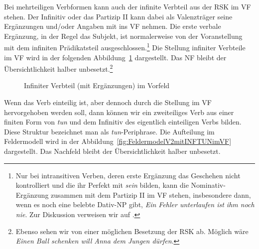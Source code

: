 Bei mehrteiligen Verbformen kann auch der infinite Verbteil aus der RSK im VF stehen. Der Infinitiv oder das Partizip II kann dabei als Valenzträger seine Ergänzungen und/oder Angaben mit ins VF nehmen. Die erste verbale Ergänzung, in der Regel das Subjekt, ist normalerweise von der Voranstellung mit dem infiniten Prädikatsteil ausgeschlossen.\footnote{Nur bei intransitiven Verben, deren erste Ergänzung das Geschehen nicht kontrolliert und die ihr Perfekt mit \textit{sein} bilden, kann die Nominativ-Ergänzung zusammen mit dem Partizip II im VF stehen, insbesondere dann, wenn es noch eine belebte Dativ-NP gibt, \zB \textit{Ein Fehler unterlaufen ist ihm noch nie}. Zur Diskussion verweisen wir auf \citet{Fanselow1992}.} Die Stellung infiniter Verbteile im VF wird in der folgenden Abbildung~\ref{fig:FeldermodelV2mitINFimVF} dargestellt. Das NF bleibt der Übersichtlichkeit halber unbesetzt.\footnote{Ebenso sehen wir von einer möglichen Besetzung der RSK ab. Möglich wäre \zB \textit{Einen Ball schenken will Anna dem Jungen dürfen}.}

\begin{figure}[!htbp]
  \centering
  \caption{Infiniter Verbteil (mit Ergänzungen) im Vorfeld}
  \label{fig:FeldermodelV2mitINFimVF}
\end{figure}

Wenn das Verb einteilig ist, aber dennoch durch die Stellung im VF hervorgehoben werden soll, dann können wir ein zweiteiliges Verb aus einer finiten Form von \textit{tun} und dem Infinitiv des eigentlich einteiligen Verbs bilden. Diese Struktur bezeichnet man als \textit{tun}-Periphrase. Die Aufteilung im Feldermodell wird in der Abbildung~\ref{fig:FeldermodelV2mitINFTUNimVF} dargestellt. Das Nachfeld bleibt der Übersichtlichkeit halber unbesetzt.

